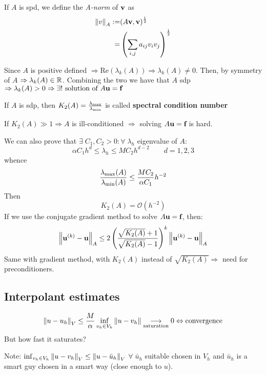 \begin{definition}
    If \(A\) is spd, we define the \textit{A-norm} of \(\textbf{v}\) as 
    \begin{align*}
        \norm{v}_A :=& (A\textbf{v}, \textbf{v})^{\frac{1}{2}}\\
        =& \left(\sum_{i,j}a_{ij} v_i v_j\right)^{\frac{1}{2}}
    \end{align*}
\end{definition}
Since \(A\) is positive defined \(\Rightarrow \text{Re}(\lambda_k(A)) \Rightarrow \lambda_k(A) \neq 0\). Then, by symmetry of \(A\) \(\Rightarrow \lambda_k(A) \in \mathbb{R}\). Combining the two we have that \(A\) sdp \(\Rightarrow \lambda_k (A) > 0 \Rightarrow \exists! \text{ solution of } A\textbf{u} = \textbf{f}\)
\begin{definition}
    If \(A\) is sdp, then \(K_2(A) = \frac{\lambda_{\text{max}}}{\lambda_{\text{min}}}\) is called \textbf{spectral condition number}
\end{definition}
If \(K_2(A) \gg 1 \Rightarrow A\) is ill-conditioned \(\Rightarrow\) solving \(A\textbf{u} = \textbf{f}\) is hard.

We can also prove that \(\exists \; C_1, C_2 > 0 : \forall \; \lambda_h\) eigenvalue of \(A\): 
\[
    \alpha C_1 h^d \leq \lambda_h \leq M C_2 h^{d-2} \qquad d = 1, 2, 3
\]
whence 
\[
    \frac{\lambda_{\text{max}}(A)}{\lambda_{\text{min}}(A)} \leq \frac{MC_2}{\alpha C_1} h^{-2}
\]
Then
\[
    K_2(A) = \mathcal{O}(h^{-2})
\]
If we use the conjugate gradient method to solve \(A\textbf{u} = \textbf{f}\), then:
\[
    \norm{\textbf{u}^{(k)} - \textbf{u}}_A \leq 2\left(\frac{\sqrt{K_2(A)}+1}{\sqrt{K_2(A)}-1}\right)^k \norm{\textbf{u}^{(k)} - \textbf{u}}_A
\]
Same with gradient method, with \(K_2(A)\) instead of \(\sqrt{K_2(A)} \Rightarrow\) need for preconditioners.
\subsection{Interpolant estimates}
\begin{equation}
    \norm{u-u_h}_V \leq \frac{M}{\alpha} \inf_{v_h \in V_h} \norm{u-v_h} \underset{\text{saturation}}{\longrightarrow} 0 \Leftrightarrow \text{convergence} 
\end{equation}
But how fast it saturates? 

Note: \(\inf_{v_h \in V_h} \norm{u-v_h}_V \leq \norm{u-\bar{u}_h}_V\) \(\forall \; \bar{u}_h\) suitable chosen in \(V_h\) and \(\bar{u}_h\) is a smart guy chosen in a smart way (close enough to \(u\)). 

